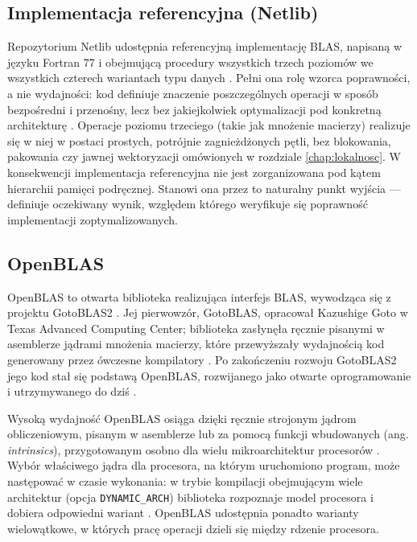 \documentclass[a4paper,12pt]{book} %
\begin{document}
\subsection{Implementacja referencyjna (Netlib)}
\label{sec:blas-netlib}

Repozytorium Netlib udostępnia referencyjną implementację BLAS, napisaną w języku Fortran 77 i obejmującą procedury wszystkich trzech poziomów we wszystkich czterech wariantach typu danych \cite{netlib_blas}. Pełni ona rolę wzorca poprawności, a nie wydajności: kod definiuje znaczenie poszczególnych operacji w sposób bezpośredni i przenośny, lecz bez jakiejkolwiek optymalizacji pod konkretną architekturę \cite{netlib_blas}. Operacje poziomu trzeciego (takie jak mnożenie macierzy) realizuje się w niej w postaci prostych, potrójnie zagnieżdżonych pętli, bez blokowania, pakowania czy jawnej wektoryzacji omówionych w rozdziale \ref{chap:lokalnosc}. W konsekwencji implementacja referencyjna nie jest zorganizowana pod kątem hierarchii pamięci podręcznej. Stanowi ona przez to naturalny punkt wyjścia --- definiuje oczekiwany wynik, względem którego weryfikuje się poprawność implementacji zoptymalizowanych.

\subsection{OpenBLAS}
\label{sec:blas-openblas}

OpenBLAS to otwarta biblioteka realizująca interfejs BLAS, wywodząca się z projektu GotoBLAS2 \cite{zhang2012openblas}. Jej pierwowzór, GotoBLAS, opracował Kazushige Goto w Texas Advanced Computing Center; biblioteka zasłynęła ręcznie pisanymi w asemblerze jądrami mnożenia macierzy, które przewyższały wydajnością kod generowany przez ówczesne kompilatory \cite{zhang2012openblas}. Po zakończeniu rozwoju GotoBLAS2 jego kod stał się podstawą OpenBLAS, rozwijanego jako otwarte oprogramowanie i utrzymywanego do dziś \cite{zhang2012openblas}.

Wysoką wydajność OpenBLAS osiąga dzięki ręcznie strojonym jądrom obliczeniowym, pisanym w asemblerze lub za pomocą funkcji wbudowanych (ang. \emph{intrinsics}), przygotowanym osobno dla wielu mikroarchitektur procesorów \cite{zhang2012openblas}. Wybór właściwego jądra dla procesora, na którym uruchomiono program, może następować w czasie wykonania: w trybie kompilacji obejmującym wiele architektur (opcja \texttt{DYNAMIC\_ARCH}) biblioteka rozpoznaje model procesora i dobiera odpowiedni wariant \cite{zhang2012openblas}. OpenBLAS udostępnia ponadto warianty wielowątkowe, w których pracę operacji dzieli się między rdzenie procesora.
\end{document}
